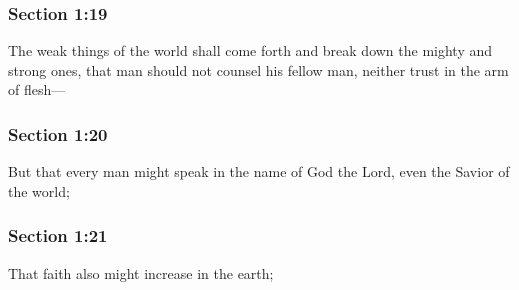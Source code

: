 	\subsubsection{Section 1:19} %
		\label{DC1-19}

		The weak things of the world shall come forth and break down the mighty and strong ones, that man should not counsel his fellow man, neither trust in the arm of flesh---


	\subsubsection{Section 1:20} %
		\label{DC1-20}

		But that every man might speak in the name of God the Lord, even the Savior of the world;


	\subsubsection{Section 1:21} %
		\label{DC1-21}

		That faith also might increase in the earth;


